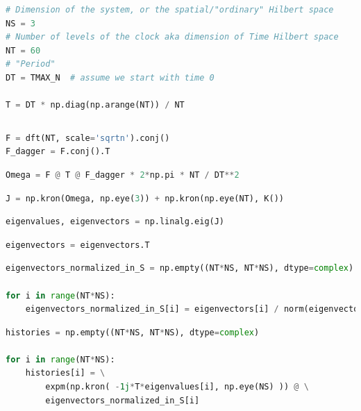 \begin{lstlisting}[language=Python]
# Dimension of the system, or the spatial/"ordinary" Hilbert space
NS = 3
# Number of levels of the clock aka dimension of Time Hilbert space
NT = 60
# "Period"
DT = TMAX_N  # assume we start with time 0

T = DT * np.diag(np.arange(NT)) / NT
\end{lstlisting}

\begin{lstlisting}[language=Python]
\end{lstlisting}

\begin{lstlisting}[language=Python]
F = dft(NT, scale='sqrtn').conj()
F_dagger = F.conj().T
\end{lstlisting}

\begin{lstlisting}[language=Python]
Omega = F @ T @ F_dagger * 2*np.pi * NT / DT**2
\end{lstlisting}

\begin{lstlisting}[language=Python]
J = np.kron(Omega, np.eye(3)) + np.kron(np.eye(NT), K())
\end{lstlisting}

\begin{lstlisting}[language=Python]
eigenvalues, eigenvectors = np.linalg.eig(J)
\end{lstlisting}

\begin{lstlisting}[language=Python]
eigenvectors = eigenvectors.T
\end{lstlisting}

\begin{lstlisting}[language=Python]
eigenvectors_normalized_in_S = np.empty((NT*NS, NT*NS), dtype=complex)

for i in range(NT*NS):
    eigenvectors_normalized_in_S[i] = eigenvectors[i] / norm(eigenvectors[i][:3])
\end{lstlisting}

\begin{lstlisting}[language=Python]
histories = np.empty((NT*NS, NT*NS), dtype=complex)

for i in range(NT*NS):
    histories[i] = \
        expm(np.kron( -1j*T*eigenvalues[i], np.eye(NS) )) @ \
        eigenvectors_normalized_in_S[i]
\end{lstlisting}

